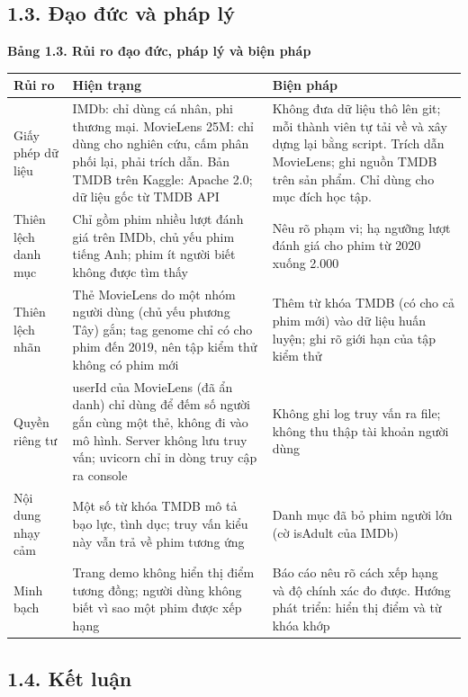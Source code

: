 \documentclass[12pt,a4paper]{article}
\newcommand{\np}{\Needspace{8\baselineskip}}
\let\oldsubsection\subsection
\renewcommand{\subsection}{\Needspace{12\baselineskip}\oldsubsection}
\begin{document}
\subsection{1.3. Đạo đức và pháp lý}

\np\textbf{Bảng 1.3. Rủi ro đạo đức, pháp lý và biện pháp}

{\def\LTcaptype{}\small
\begin{longtable}[]{@{}*{3}{P{(\linewidth - 4\tabcolsep) * }}@{}}
\toprule
\textbf{Rủi ro} & \textbf{Hiện trạng} & \textbf{Biện pháp} \\
\midrule
\endhead
\bottomrule
\endlastfoot
Giấy phép dữ liệu & IMDb: chỉ dùng cá nhân, phi thương mại. MovieLens 25M: chỉ dùng cho nghiên cứu, cấm phân phối lại, phải trích dẫn. Bản TMDB trên Kaggle: Apache 2.0; dữ liệu gốc từ TMDB API & Không đưa dữ liệu thô lên git; mỗi thành viên tự tải về và xây dựng lại bằng script. Trích dẫn MovieLens; ghi nguồn TMDB trên sản phẩm. Chỉ dùng cho mục đích học tập. \\
Thiên lệch danh mục & Chỉ gồm phim nhiều lượt đánh giá trên IMDb, chủ yếu phim tiếng Anh; phim ít người biết không được tìm thấy & Nêu rõ phạm vi; hạ ngưỡng lượt đánh giá cho phim từ 2020 xuống 2.000 \\
Thiên lệch nhãn & Thẻ MovieLens do một nhóm người dùng (chủ yếu phương Tây) gắn; tag genome chỉ có cho phim đến 2019, nên tập kiểm thử không có phim mới & Thêm từ khóa TMDB (có cho cả phim mới) vào dữ liệu huấn luyện; ghi rõ giới hạn của tập kiểm thử \\
Quyền riêng tư & userId của MovieLens (đã ẩn danh) chỉ dùng để đếm số người gắn cùng một thẻ, không đi vào mô hình. Server không lưu truy vấn; uvicorn chỉ in dòng truy cập ra console & Không ghi log truy vấn ra file; không thu thập tài khoản người dùng \\
Nội dung nhạy cảm & Một số từ khóa TMDB mô tả bạo lực, tình dục; truy vấn kiểu này vẫn trả về phim tương ứng & Danh mục đã bỏ phim người lớn (cờ isAdult của IMDb) \\
Minh bạch & Trang demo không hiển thị điểm tương đồng; người dùng không biết vì sao một phim được xếp hạng & Báo cáo nêu rõ cách xếp hạng và độ chính xác đo được. Hướng phát triển: hiển thị điểm và từ khóa khớp \\
\end{longtable}
}

\subsection{1.4. Kết luận}
\end{document}
